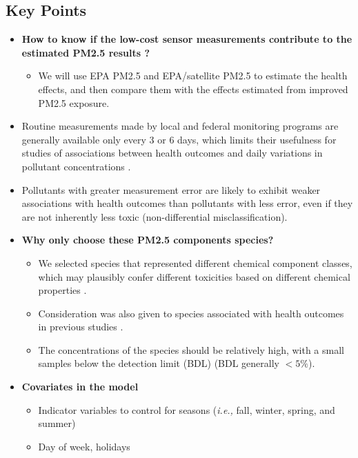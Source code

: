 \documentclass{article}
\begin{document}
\subsection{Key Points}
\begin{itemize}
    \item \textbf{How to know if the low-cost sensor measurements contribute to the estimated PM2.5 results ?}{
        \begin{itemize}
            \item We will use EPA PM2.5 and EPA/satellite PM2.5 to estimate the health effects, and then compare them with the effects estimated from improved PM2.5 exposure.
        \end{itemize}
    }
    \item Routine measurements made by local and federal monitoring programs are generally available only every 3 or 6 days, which limits their usefulness for studies of associations between health outcomes and daily variations in pollutant concentrations \citep{sarnat2015fine}.
    \item Pollutants with greater measurement error are likely to exhibit weaker associations with health outcomes than pollutants with less error, even if they are not inherently less toxic (non-differential misclassification).
    \item \textbf{Why only choose these PM2.5 components species?} {
        \begin{itemize}
            \item We selected species that represented different chemical component classes, which may plausibly confer different toxicities based on different chemical properties \citep{suh2011chemical}. 
            \item Consideration was also given to species associated with health outcomes in previous studies \citep{chen2009effects, kelly2012size, rohr2012attributing}.
            \item The concentrations of the species should be relatively high, with a small samples below the detection limit (BDL) (BDL generally $<5\%$).
        \end{itemize}
    }
    \item \textbf{Covariates in the model} {
        \begin{itemize}
            \item Indicator variables to control for seasons (\textit{i.e.,} fall, winter, spring, and summer)
            \item Day of week, holidays

\end{itemize}}
\end{itemize}
\end{document}
